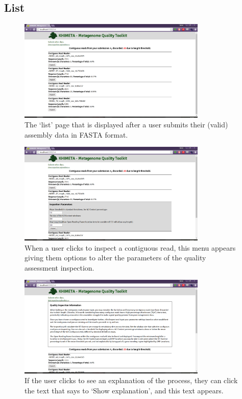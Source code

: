 \subsection{List}
\begin{figure}[H]
	\centering
\includegraphics[width=0.8\textwidth]{images/ui2}
\caption{The `list' page that is displayed after a user submits their (valid) assembly data in FASTA format.}
\end{figure}

\begin{figure}[H]
	\centering
\includegraphics[width=0.8\textwidth]{images/ui3}
\caption{When a user clicks to inspect a contiguous read, this menu appears giving them options to alter the parameters of the quality assessment inspection.}
\end{figure}

\begin{figure}[H]
	\centering
\includegraphics[width=0.8\textwidth]{images/ui4}
\caption{If the user clicks to see an explanation of the process, they can click the text that says to `Show explanation', and this text appears.}
\end{figure}

